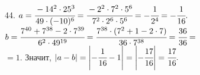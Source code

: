 44. $a=\cfrac{-14^2\cdot25^3}{49\cdot(-10)^6}=\cfrac{-2^2\cdot7^2\cdot5^6}{7^2\cdot2^6\cdot5^6}=-\cfrac{1}{2^4}=-\cfrac{1}{16}.$
$b=\cfrac{7^{40}+7^{38}-2\cdot7^{39}}{6^2\cdot49^{19}}=\cfrac{7^{38}\cdot(7^2+1-2\cdot7)}{36\cdot7^{38}}=
\cfrac{36}{36}=$\\$=1.$ Значит, $|a-b|=\left|-\cfrac{1}{16}-1\right|=\left|-\cfrac{17}{16}\right|=\cfrac{17}{16}.$\\
